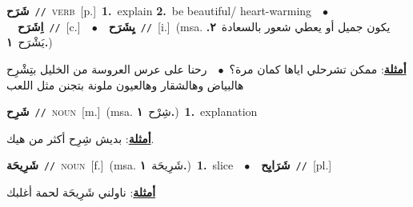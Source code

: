 \documentclass[10pt,a4paper,twoside]{article} %
\begin{document}
\begin{multicols}{2}
{\setlength\topsep{0pt}\textbf{\foreignlanguage{arabic}{شَرَح}}\ {\color{gray}\texttt{//}\color{black}}\ \textsc{verb}\ [p.]\ \textbf{1.}~explain  \textbf{2.}~be beautiful/ heart-warming\ \ $\bullet$\ \ \setlength\topsep{0pt}\textbf{\foreignlanguage{arabic}{اِشَرَح}}\ {\color{gray}\texttt{//}\color{black}}\ [c.]\ \ $\bullet$\ \ \setlength\topsep{0pt}\textbf{\foreignlanguage{arabic}{يِشَرَح}}\ {\color{gray}\texttt{//}\color{black}}\ [i.]\ \color{gray}(msa. \foreignlanguage{arabic}{يكون جميل أو يعطي شعور بالسعادة}~\foreignlanguage{arabic}{\textbf{٢.}}  \foreignlanguage{arabic}{يَشْرَح}~\foreignlanguage{arabic}{\textbf{١.}})\color{black}\  \begin{flushright}\color{gray}\foreignlanguage{arabic}{\textbf{\underline{\foreignlanguage{arabic}{أمثلة}}}: ممكن تشرحلي اياها كمان مرة؟\ $\bullet$\ \  رحنا على عرس العروسة من الخليل بتِشْرِح هالبياض وهالشقار وهالعيون ملونة بتجنن مثل اللعب}\end{flushright}\color{black}} \vspace{2mm}

{\setlength\topsep{0pt}\textbf{\foreignlanguage{arabic}{شَرِح}}\ {\color{gray}\texttt{//}\color{black}}\ \textsc{noun}\ [m.]\ \color{gray}(msa. \foreignlanguage{arabic}{شِرْح}~\foreignlanguage{arabic}{\textbf{١.}})\color{black}\ \textbf{1.}~explanation\  \begin{flushright}\color{gray}\foreignlanguage{arabic}{\textbf{\underline{\foreignlanguage{arabic}{أمثلة}}}: بديش شِرِح أكثر من هيك.}\end{flushright}\color{black}} \vspace{2mm}

{\setlength\topsep{0pt}\textbf{\foreignlanguage{arabic}{شَرِيحَة}}\ {\color{gray}\texttt{//}\color{black}}\ \textsc{noun}\ [f.]\ \color{gray}(msa. \foreignlanguage{arabic}{شَرِيحَة}~\foreignlanguage{arabic}{\textbf{١.}})\color{black}\ \textbf{1.}~slice\ \ $\bullet$\ \ \setlength\topsep{0pt}\textbf{\foreignlanguage{arabic}{شَرَايِح}}\ {\color{gray}\texttt{//}\color{black}}\ [pl.]\  \begin{flushright}\color{gray}\foreignlanguage{arabic}{\textbf{\underline{\foreignlanguage{arabic}{أمثلة}}}: ناولني شَرِيحَة لحمة أغلبك}\end{flushright}\color{black}} \vspace{2mm}


\end{multicols}
\end{document}
